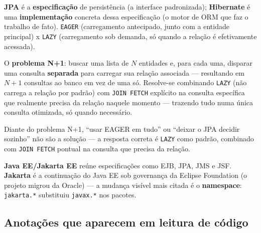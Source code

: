 \begin{conceito}
\textbf{JPA} é a \textbf{especificação} de persistência (a interface
padronizada); \textbf{Hibernate} é uma \textbf{implementação} concreta
dessa especificação (o motor de ORM que faz o trabalho de fato).
\texttt{EAGER} (carregamento antecipado, junto com a entidade principal)
x \texttt{LAZY} (carregamento sob demanda, só quando a relação é
efetivamente acessada).

O \textbf{problema N+1}: buscar uma lista de $N$ entidades e, para cada
uma, disparar uma consulta \textbf{separada} para carregar sua relação
associada --- resultando em $N+1$ consultas ao banco em vez de uma só.
Resolve-se combinando \texttt{LAZY} (não carrega a relação por padrão)
com \texttt{JOIN FETCH} explícito na consulta específica que realmente
precisa da relação naquele momento --- trazendo tudo numa única consulta
otimizada, só quando necessário.
\end{conceito}

\begin{cuidado}
Diante do problema N+1, “usar EAGER em tudo” ou “deixar o JPA decidir
sozinho” não são a solução --- a resposta correta é \texttt{LAZY} como
padrão, combinado com \texttt{JOIN FETCH} pontual na consulta que precisa
da relação.
\end{cuidado}

\begin{conceito}
\textbf{Java EE/Jakarta EE} reúne especificações como EJB, JPA, JMS e
JSF. \textbf{Jakarta} é a continuação do Java EE sob governança da
Eclipse Foundation (o projeto migrou da Oracle) --- a mudança visível mais
citada é o \textbf{namespace}: \texttt{jakarta.*} substituiu
\texttt{javax.*} nos pacotes.
\end{conceito}

\subsection{Anotações que aparecem em leitura de código}

